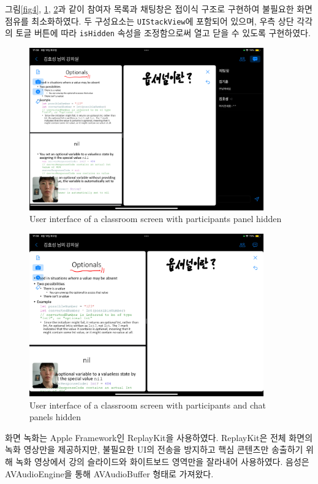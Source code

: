 \documentclass[pdflatex,sn-mathphys-num]{sn-jnl}%
\theoremstyle{thmstyleone}%
\theoremstyle{thmstyletwo}%
\theoremstyle{thmstylethree}%
\begin{document}
그림\ref{fig4}, \ref{fig5}, \ref{fig6}과 같이 참여자 목록과 채팅창은 접이식 구조로 구현하여 불필요한 화면 점유를 최소화하였다. 두 구성요소는 \verb+UIStackView+에 포함되어 있으며, 우측 상단 각각의 토글 버튼에 따라 \verb+isHidden+ 속성을 조정함으로써 열고 닫을 수 있도록 구현하였다.

\begin{figure}[H]
\centering
\includegraphics[width=0.9\textwidth]{room1.PNG}
\caption{User interface of a classroom screen with participants panel hidden}\label{fig5}
\end{figure}

\begin{figure}[H]
\centering
\includegraphics[width=0.9\textwidth]{room2.PNG}
\caption{User interface of a classroom screen with participants and chat panels hidden}\label{fig6}
\end{figure}

\noindent
화면 녹화는 Apple Framework인 ReplayKit\cite{ReplayKit}을 사용하였다. ReplayKit은 전체 화면의 녹화 영상만을 제공하지만, 불필요한 UI의 전송을 방지하고 핵심 콘텐츠만 송출하기 위해 녹화 영상에서 강의 슬라이드와 화이트보드 영역만을 잘라내어 사용하였다. 음성은 AVAudioEngine을 통해 AVAudioBuffer 형태로 가져왔다.
\end{document}
